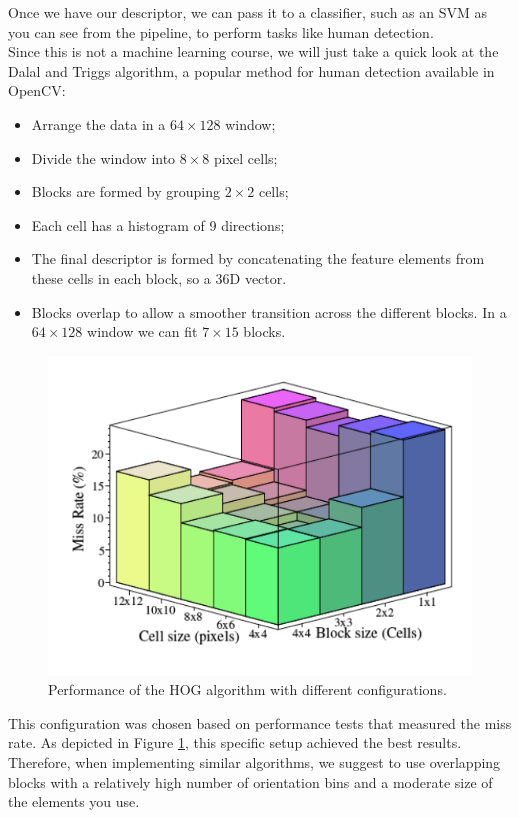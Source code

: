Once we have our descriptor, we can pass it to a classifier, such as an SVM as you can see from the pipeline, to perform tasks like human detection. 
\\
Since this is not a machine learning course, we will just take a quick look at the Dalal and Triggs algorithm, a popular method for human detection available in OpenCV:

\begin{itemize}
    \item Arrange the data in a $64\times128$ window;
    \item Divide the window into $8\times8$ pixel cells;
    \item Blocks are formed by grouping $2\times2$ cells;
    \item Each cell has a histogram of 9 directions;
    \item The final descriptor is formed by concatenating the feature elements from these cells in each block, so a 36D vector.
    \item Blocks overlap to allow a smoother transition across the different blocks. In a $64\times128$ window we can fit $7\times15$ blocks.
\end{itemize}

\begin{figure}
    \includegraphics[scale=0.3]{Figures/Performance.png}
    \caption{Performance of the HOG algorithm with different configurations.}
    \label{fig:Performance}
\end{figure}
This configuration was chosen based on performance tests that measured the miss rate. As depicted in Figure \ref{fig:Performance}, this specific setup achieved the best results. Therefore, when implementing similar algorithms, we suggest to use overlapping blocks with a relatively high number of orientation bins and a moderate size of the elements you use.
